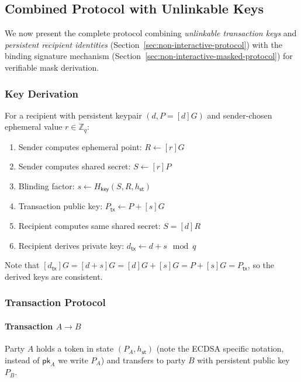 \documentclass{article}
\newcommand{\pubkey}[0]{\mathsf{pk}}
\newcommand{\sthash}[0]{{h_\mathsf{st}}}
\begin{document}
\subsection{Combined Protocol with Unlinkable Keys}

We now present the complete protocol combining \emph{unlinkable transaction keys} and \emph{persistent recipient identities} (Section~\ref{sec:non-interactive-protocol}) with the binding signature mechanism (Section~\ref{sec:non-interactive-masked-protocol}) for verifiable mask derivation.

\subsubsection{Key Derivation}

For a recipient with persistent keypair $(d, P = [d]G)$ and sender-chosen ephemeral value $r \in \mathbb{Z}_q$:

\begin{enumerate}
\item Sender computes ephemeral point: $R \gets [r]G$
\item Sender computes shared secret: $S \gets [r]P$
\item Blinding factor: $s \gets H_{\mathsf{key}}(S, R, \sthash)$
\item Transaction public key: $P_{\mathsf{tx}} \gets P + [s]G$
\item Recipient computes same shared secret: $S = [d]R$
\item Recipient derives private key: $d_{\mathsf{tx}} \gets d + s \mod q$
\end{enumerate}

Note that $[d_{\mathsf{tx}}]G = [d + s]G = [d]G + [s]G = P + [s]G = P_{\mathsf{tx}}$, so the derived keys are consistent.

\subsubsection{Transaction Protocol}

\paragraph{Transaction $A \to B$}

Party $A$ holds a token in state $(P_A, \sthash)$  (note the ECDSA specific notation, instead of $\pubkey_A$ we write $P_A$) and transfers to party $B$ with persistent public key $P_B$.
\end{document}
